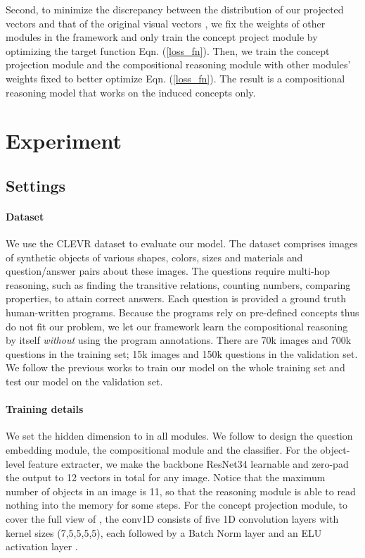 \documentclass[final]{cvpr}
\begin{document}
Second, to minimize the discrepancy between the distribution of our projected vectors and that of the original visual vectors , we fix the weights of other modules in the framework and only train the concept project module by optimizing the target function Eqn. (\ref{loss_fn}). Then, we train the concept projection module and the compositional reasoning module with other modules' weights fixed to better optimize Eqn. (\ref{loss_fn}). The result is a compositional reasoning model that works on the induced concepts only. 




\section{Experiment}
\subsection{Settings}
\paragraph{Dataset}
We use the CLEVR \cite{johnson2017clevr} dataset to evaluate our model. The dataset comprises images of synthetic objects of various shapes, colors, sizes and materials and question/answer pairs about these images. The questions require multi-hop reasoning, such as finding the transitive relations, counting numbers, comparing properties, to attain correct answers. 
Each question is provided a ground truth human-written programs.
Because the programs rely on pre-defined concepts thus do not fit our problem, we let our framework learn the compositional reasoning by itself \emph{without} using the program annotations.
There are 70k images and 700k questions in the training set; 15k images and 150k questions in the validation set. We follow the previous works \cite{yi2018neural,hudson2018compositional,mao2018neuro} to train our model on the whole training set and test our model on the validation set. 
\paragraph{Training details}
We set the hidden dimension  to in all modules. We follow \cite{hudson2018compositional} to design the question embedding module, the compositional module and the classifier. For the object-level feature extracter, we make the backbone ResNet34 learnable and zero-pad the output  to 12 vectors in total for any image. Notice that the maximum number of objects in an image is 11, so that the reasoning module is able to read nothing into the memory for some steps. For the concept projection module, to cover the full view of , the conv1D consists of five 1D convolution layers with kernel sizes (7,5,5,5,5),
each followed by a Batch Norm layer \cite{ioffe2015batch} and an ELU activation layer \cite{clevert2015fast}. 
\end{document}
